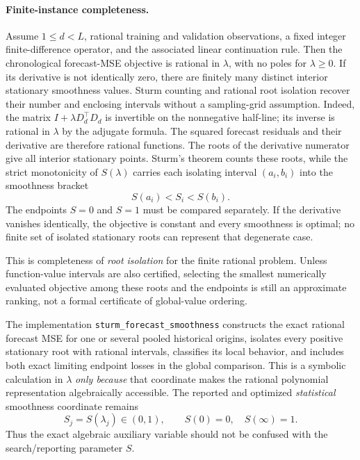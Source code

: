 \documentclass[english]{smcca}
\begin{document}
\paragraph{Finite-instance completeness.}
Assume $1\le d<L$, rational training and validation
observations, a fixed integer finite-difference operator,
and the associated linear continuation rule. Then the
chronological forecast-MSE objective is rational in
$\lambda$, with no poles for $\lambda\ge0$.
If its derivative is not identically zero, there are
finitely many distinct interior stationary smoothness
values. Sturm counting and rational root isolation
recover their number and enclosing intervals without
a sampling-grid assumption. Indeed, the matrix
$I+\lambda D_d^\top D_d$ is invertible on the
nonnegative half-line; its inverse is rational in
$\lambda$ by the adjugate formula. The squared
forecast residuals and their derivative are therefore
rational functions. The roots of the derivative
numerator give all interior stationary points.
Sturm's theorem counts these roots, while the strict
monotonicity of $S(\lambda)$ carries each isolating
interval $(a_i,b_i)$ into the smoothness bracket
\begin{equation}
\label{eq:sturm_s_brackets}
S(a_i)<S_i<S(b_i).
\end{equation}
The endpoints $S=0$ and $S=1$ must be compared
separately. If the derivative vanishes identically,
the objective is constant and every smoothness is
optimal; no finite set of isolated stationary roots
can represent that degenerate case.

This is completeness of \emph{root isolation} for the
finite rational problem. Unless function-value
intervals are also certified, selecting the smallest
numerically evaluated objective among these roots
and the endpoints is still an approximate ranking,
not a formal certificate of global-value ordering.

The implementation \texttt{sturm\_forecast\_smoothness} constructs
the exact rational forecast MSE for one or several pooled
historical origins, isolates every positive stationary root
with rational intervals, classifies its local behavior, and
includes both exact limiting endpoint losses in the global
comparison. This is a symbolic calculation in $\lambda$
\emph{only because} that coordinate makes the rational
polynomial representation algebraically accessible.
The reported and optimized \emph{statistical} smoothness
coordinate remains
\begin{equation}
\label{eq:sturm_map_to_s}
S_j=S(\lambda_j)\in(0,1),
\qquad
S(0)=0,\quad S(\infty)=1.
\end{equation}
Thus the exact algebraic auxiliary variable should not be
confused with the search/reporting parameter $S$.
\end{document}
